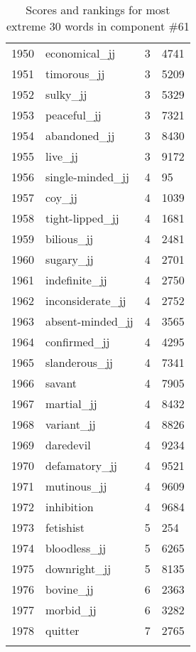 \begin{longtable}[!htbp]{| rlr@{.}l |}
    1950 & economical\_jj & 3 & 4741 \\
    1951 & timorous\_jj & 3 & 5209 \\
    1952 & sulky\_jj & 3 & 5329 \\
    1953 & peaceful\_jj & 3 & 7321 \\
    1954 & abandoned\_jj & 3 & 8430 \\
    1955 & live\_jj & 3 & 9172 \\
    1956 & single-minded\_jj & 4 & 95 \\
    1957 & coy\_jj & 4 & 1039 \\
    1958 & tight-lipped\_jj & 4 & 1681 \\
    1959 & bilious\_jj & 4 & 2481 \\
    1960 & sugary\_jj & 4 & 2701 \\
    1961 & indefinite\_jj & 4 & 2750 \\
    1962 & inconsiderate\_jj & 4 & 2752 \\
    1963 & absent-minded\_jj & 4 & 3565 \\
    1964 & confirmed\_jj & 4 & 4295 \\
    1965 & slanderous\_jj & 4 & 7341 \\
    1966 & savant & 4 & 7905 \\
    1967 & martial\_jj & 4 & 8432 \\
    1968 & variant\_jj & 4 & 8826 \\
    1969 & daredevil & 4 & 9234 \\
    1970 & defamatory\_jj & 4 & 9521 \\
    1971 & mutinous\_jj & 4 & 9609 \\
    1972 & inhibition & 4 & 9684 \\
    1973 & fetishist & 5 & 254 \\
    1974 & bloodless\_jj & 5 & 6265 \\
    1975 & downright\_jj & 5 & 8135 \\
    1976 & bovine\_jj & 6 & 2363 \\
    1977 & morbid\_jj & 6 & 3282 \\
    1978 & quitter & 7 & 2765 \\
    \hline
    \caption{Scores and rankings for most extreme 30 words in component \#61} \\
\end{longtable}
